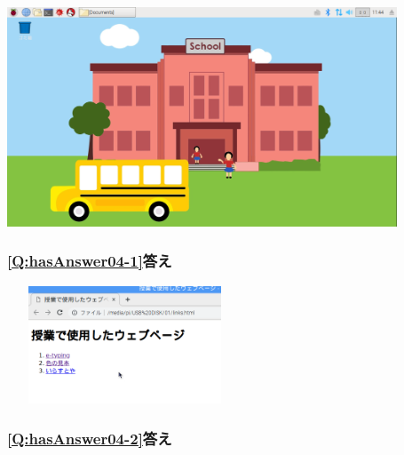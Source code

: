 \documentclass[a4paper,12pt]{jarticle}
\begin{document}
\centering
\includegraphics[width=11.621cm,height=6.533cm]{textbook-img223.png}


\flushleft
\clearpage
\begin{minipage}{\textwidth}
  \subsubsection{\bfseries
  \ref*{Q:hasAnswer04-1}答え}

  \centering
  \includegraphics[width=7.0cm,height=3.5cm]{textbook-img224.png}
  \flushleft

  \subsubsection{\bfseries
  \ref*{Q:hasAnswer04-2}答え}


\end{minipage}
\end{document}
